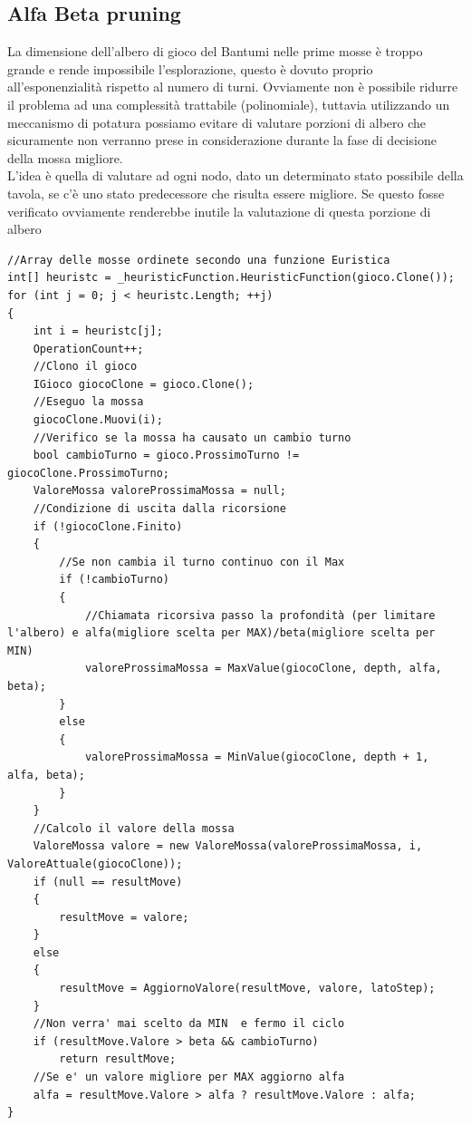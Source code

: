 \documentclass[paper=a4, fontsize=11pt]{scrartcl}	%
\numberwithin{equation}{section}															%
\numberwithin{figure}{section}																%
\numberwithin{table}{section}																%
\begin{document}
\subsection{Alfa Beta pruning}
La dimensione dell'albero di gioco del Bantumi nelle prime mosse \`e troppo grande e rende impossibile l'esplorazione, questo \`e dovuto proprio all'esponenzialit\`a rispetto al numero di turni. Ovviamente non \`e possibile ridurre il problema ad una complessit\`a trattabile (polinomiale), tuttavia utilizzando un meccanismo di potatura possiamo evitare di valutare porzioni di albero che sicuramente non verranno prese in considerazione durante la fase di decisione della mossa migliore.\\ 
L'idea \`e quella di valutare ad ogni nodo, dato un determinato stato possibile della tavola, se c'\`e uno stato predecessore che risulta essere migliore. Se questo fosse verificato ovviamente renderebbe inutile la valutazione di questa porzione di albero
\begin{lstlisting}[label=maxPruning,caption=Implementazione Max con taglio]
//Array delle mosse ordinete secondo una funzione Euristica
int[] heuristc = _heuristicFunction.HeuristicFunction(gioco.Clone());
for (int j = 0; j < heuristc.Length; ++j)
{
    int i = heuristc[j];
    OperationCount++;
	//Clono il gioco
    IGioco giocoClone = gioco.Clone();
	//Eseguo la mossa
    giocoClone.Muovi(i);
	//Verifico se la mossa ha causato un cambio turno
    bool cambioTurno = gioco.ProssimoTurno != giocoClone.ProssimoTurno;
    ValoreMossa valoreProssimaMossa = null;
	//Condizione di uscita dalla ricorsione
    if (!giocoClone.Finito)
    {
		//Se non cambia il turno continuo con il Max
        if (!cambioTurno)
		{
			//Chiamata ricorsiva passo la profondità (per limitare l'albero) e alfa(migliore scelta per MAX)/beta(migliore scelta per MIN)
            valoreProssimaMossa = MaxValue(giocoClone, depth, alfa, beta);
		}
        else
		{
            valoreProssimaMossa = MinValue(giocoClone, depth + 1, alfa, beta);
		}
    }
	//Calcolo il valore della mossa	
    ValoreMossa valore = new ValoreMossa(valoreProssimaMossa, i, ValoreAttuale(giocoClone));
    if (null == resultMove)
    {
        resultMove = valore;
    }
    else
    {
        resultMove = AggiornoValore(resultMove, valore, latoStep);
    }
	//Non verra' mai scelto da MIN  e fermo il ciclo
    if (resultMove.Valore > beta && cambioTurno)
        return resultMove;
	//Se e' un valore migliore per MAX aggiorno alfa
    alfa = resultMove.Valore > alfa ? resultMove.Valore : alfa;
}\end{lstlisting}
\end{document}
